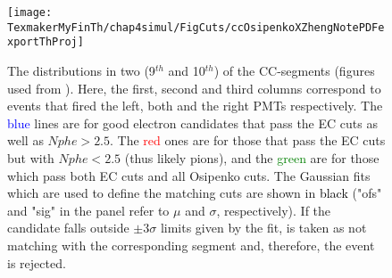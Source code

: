 \begin{figure}[H] %
\centering
\leavevmode \texttt{[image: TexmakerMyFinTh/chap4simul/FigCuts/ccOsipenkoXZhengNotePDFexportThProj]}  %
\caption[CC-projected \th distributions]{The \thp distributions %
in two (9$^{th}$ and 10$^{th}$) of the CC-segments (figures used from \cite{anaNoteXZheng}). Here, the first, second and third columns correspond to events that fired the left, both and the right PMTs respectively. The \textcolor{blue}{blue} lines are for good electron candidates that pass the EC cuts as well as $Nphe > 2.5$. The \textcolor{red}{red} ones are for those that pass the EC cuts but with $Nphe < 2.5$ (thus likely pions), and the \textcolor{green}{green} are for those which pass both EC cuts and all Osipenko cuts. The Gaussian fits which are used to define the \th matching cuts are shown in \textcolor{black}{black} ("ofs" and "sig" in the panel refer to $\mu$ and $\sigma$, respectively). If the candidate falls outside $\pm 3 \sigma$ limits given by the fit, \thp is taken as not matching with the corresponding segment and, therefore, the event is rejected.}
\label{ccThProjDist}
\end{figure}
    

